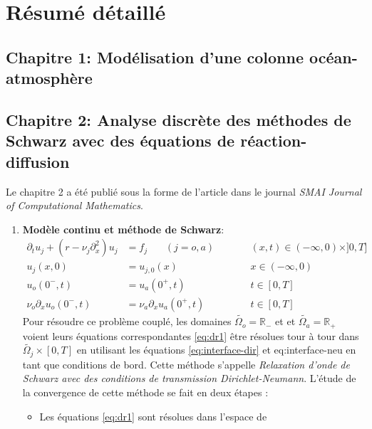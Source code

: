 \chapter*{Résumé détaillé}
\section*{Chapitre 1: Modélisation d'une colonne océan-atmosphère}
\section*{Chapitre 2: Analyse discrète des méthodes de Schwarz avec des équations de réaction-diffusion}
Le chapitre 2 a été publié sous la forme de l'article
\citep{clement_discrete_2022-1} dans le journal
\textit{SMAI Journal of Computational Mathematics}.
\begin{enumerate}
\item \textbf{Modèle continu et méthode de Schwarz}:
\begin{subequations}
\begin{align}
\partial_t u_j +( r - \nu_j \partial_x^2) u_j &= f_j ~~~~~~~~
(j=o,a) &\qquad&
(x,t) \in (-\infty,0) \times ]0,T] \label{eq:dr1} \\
u_j(x,0) &= u_{j,0}(x)   &\qquad&  x \in (-\infty,0)  \\
u_o(0^-,t) &=  u_a(0^+,t) &\qquad& t \in [0,T] \label{eq:interface-dir} \\
\nu_o \partial_x u_o(0^-,t) &= \nu_a \partial_x u_a(0^+,t) &\qquad& t \in [0,T] \label{eq:interface-neu} 
\end{align}
\label{eq:resume_francais_model-problem}
\end{subequations}
Pour résoudre ce problème couplé, les domaines
$\widetilde{\Omega_o} = \mathbb{R_{-}}$ et
et $\widetilde{\Omega_a} = \mathbb{R_{+}}$ voient leurs équations
correspondantes \eqref{eq:dr1} être résolues tour à tour
dans $\widetilde{\Omega_j} \times [0,T]$
en utilisant les équations
\eqref{eq:interface-dir} et {eq:interface-neu}
en tant que conditions de bord.
Cette méthode s'appelle \textit{Relaxation d'onde de Schwarz avec
des conditions de transmission Dirichlet-Neumann}.
L'étude de la convergence de cette méthode se fait en deux étapes :
\begin{itemize}
\item Les équations \eqref{eq:dr1} sont résolues dans l'espace de

\end{itemize}
\end{enumerate}

